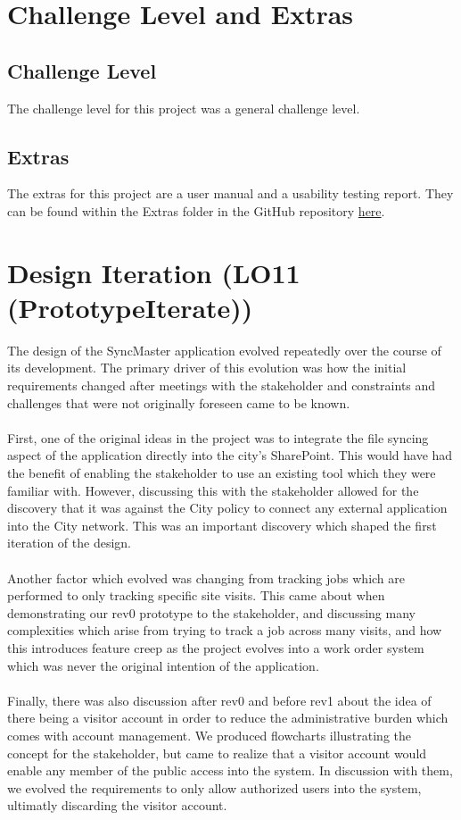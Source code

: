\documentclass{article}
\begin{document}
\section{Challenge Level and Extras}

\subsection{Challenge Level}

The challenge level for this project was a general challenge level.

\subsection{Extras}

The extras for this project are a user manual and a usability testing report.
They can be found within the Extras folder in the GitHub repository 
\href{https://github.com/Spitgranger/SyncMaster/tree/main/docs/Extras}{here}.

\section{Design Iteration (LO11 (PrototypeIterate))}

The design of the SyncMaster application evolved repeatedly over the course of its development.
The primary driver of this evolution was how the initial requirements changed after meetings with the stakeholder
and constraints and challenges that were not originally foreseen came to be known.\\
\\
First, one of the original ideas in the project was to integrate the file syncing aspect of the application directly into the city's
SharePoint. This would have had the benefit of enabling the stakeholder to use an existing tool which they were familiar with.
However, discussing this with the stakeholder allowed for the discovery that it was against the City policy to connect any
external application into the City network. This was an important discovery which shaped the first iteration of the design.\\
\\
Another factor which evolved was changing from tracking jobs which are performed to only tracking specific site visits. This
came about when demonstrating our rev0 prototype to the stakeholder, and discussing many complexities which arise from trying
to track a job across many visits, and how this introduces feature creep as the project evolves into a work order system which
was never the original intention of the application.\\
\\
Finally, there was also discussion after rev0 and before rev1 about the idea of there being a visitor account in order to
reduce the administrative burden which comes with account management. We produced flowcharts illustrating the concept for the
stakeholder, but came to realize that a visitor account would enable any member of the public access into the system. In discussion
with them, we evolved the requirements to only allow authorized users into the system, ultimatly discarding the visitor account.
\end{document}
